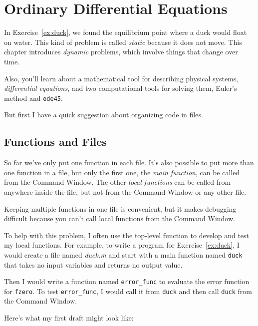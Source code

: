 \documentclass[../../book.tex]{subfiles}
\begin{document}
\chapter{Ordinary Differential Equations}


In Exercise~\ref{ex:duck}, we found the equilibrium point where a duck would float on water.  This kind of problem is called \emph{static} because it does not move.  This chapter introduces \emph{dynamic} problems, which involve things that change over time.

Also, you'll learn about a mathematical tool for describing physical systems, \emph{differential equations}, and two computational tools for solving them, Euler's method and \lstinline{ode45}.

But first I have a quick suggestion about organizing code in files.

\section{Functions and Files}
\label{funfiles}

So far we've only put one function in each file.  It's also possible
to put more than one function in a file, but only the first one, the
\emph{main function}, can be called from the Command
Window.  The other \emph{local functions} can be called from anywhere inside the file, but not from the Command Window or any other file.


Keeping multiple functions in one file is convenient, but it makes  debugging
difficult because you can't call local functions from the Command
Window.

To help with this problem, I often use the top-level function
to develop and test my local functions.  For example, to write
a program for Exercise~\ref{ex:duck}, I would create a file named
\emph{duck.m} and start with a main function named \lstinline{duck}
that takes no input variables and returns no output value.

Then I would write a function named \lstinline{error_func} to
evaluate the error function for \lstinline{fzero}.  To test
\lstinline{error_func}, I would call it from \lstinline{duck} and then
call \lstinline{duck} from the Command Window.


Here's what my first draft might look like:
\end{document}
